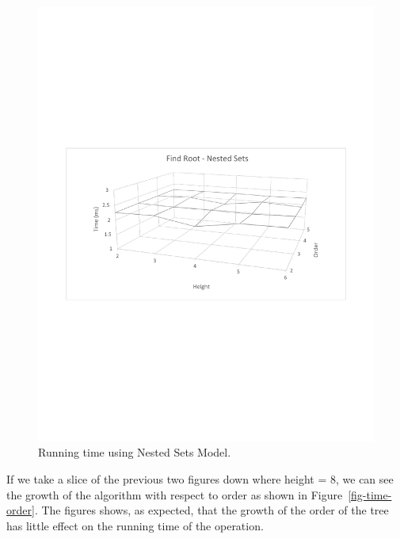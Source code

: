 \begin{figure}[h]
\begin{center}
\includegraphics[width=6in]{images/root-ns-wire.pdf}
\caption{Running time using Nested Sets Model.\label{fig-root-ns}}
\end{center}
\end{figure}

If we take a slice of the previous two figures down where height = 8, we can see the growth of the algorithm with respect to order as shown in Figure~\ref{fig-time-order}. The figures shows, as expected, that the growth of the order of the tree has little effect on the running time of the operation.

